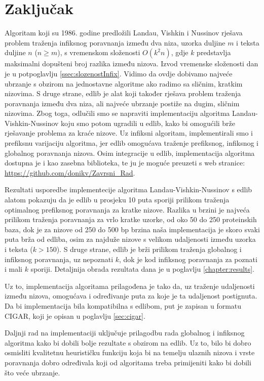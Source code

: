 \documentclass[times, utf8, zavrsni]{fer}
\begin{document}
\chapter{Zaključak}
Algoritam koji su 1986. godine predložili Landau, Vishkin i Nussinov \citep{Landau1986} rješava problem traženja infiksnog poravnanja između dva niza, uzorka duljine $m$ i teksta duljine $n$ ($n\geq m$), s vremenskom složenosti $O(k^2n)$, gdje $k$ predstavlja maksimalni dopušteni broj razlika između nizova. Izvod vremenske složenosti dan je u potpoglavlju \ref{ssec:slozenostInfix}. Vidimo da ovdje dobivamo najveće ubrzanje s obzirom na jednostavne algoritme ako radimo sa sličnim, kratkim nizovima. S druge strane, edlib \citep{edlib} je alat koji također rješava problem traženja poravnanja između dva niza, ali najveće ubrzanje postiže na dugim, sličnim nizovima. Zbog toga, odlučili smo se napraviti implementaciju algoritma Landau-Vishkin-Nussinov koju smo potom ugradili u edlib, kako bi omogućili brže rješavanje problema za kraće nizove. Uz infiksni algoritam, implementirali smo i prefiksnu varijaciju algoritma, jer edlib omogućava traženje prefiksnog, infiksnog i globalnog poravnanja nizova. Osim integracije u edlib, implementacija algoritma dostupna je i kao zasebna biblioteka, te ju je moguće preuzeti s web stranice: \href{https://github.com/donikv/Zavrsni_Rad}{https://github.com/donikv/Zavrsni\_Rad}.

Rezultati usporedbe implementecije algoritma Landau-Vishkin-Nussinov s edlib alatom pokazuju da je edlib u prosjeku 10 puta sporiji prilikom traženja optimalnog prefiksnog poravnanja za kratke nizove. Razlika u brzini je najveća prilikom traženja poravnanja za vrlo kratke uzorke, od oko 50 do 250 proteinskih baza, dok je za nizove od 250 do 500 bp brzina naša implementacija je skoro svaki puta brža od edliba, osim za najduže nizove s velikom udaljenosti između uzorka i teksta ($k>150$). S druge strane, edlib je brži prilikom traženja globalnog i infiksnog poravnanja, uz nepoznati $k$, dok je kod infiksnog poravnanja za poznati i mali $k$ sporiji. Detaljnija obrada rezultata dana je u poglavlju \ref{chapter:results}.

Uz to, implementacija algoritama prilagođena je tako da, uz traženje udaljenosti između nizova, omogućava i određivanje puta za koje je ta udaljenost postignuta. Da bi implementacija bila kompatibilna s edlibom, put je zapisan u formatu CIGAR, koji je opisan u poglavlju \ref{sec:cigar}.

Daljnji rad na implementaciji uključuje prilagodbu rada globalnog i infiksnog algoritma kako bi dobili bolje rezultate s obzirom na edlib. Uz to, bilo bi dobro osmisliti kvalitetnu heurističku funkciju koja bi na temelju ulaznih nizova i vrste poravnanja dobro određivala koji od algoritama treba primijeniti kako bi dobili što veće ubrzanje.
\end{document}
